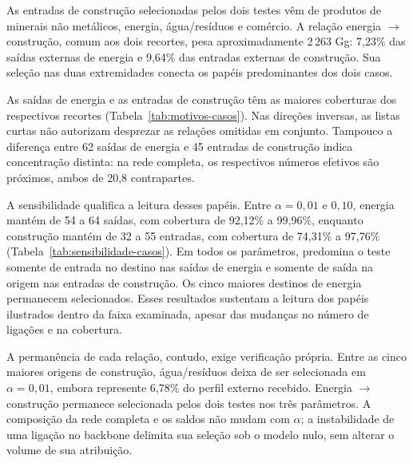 As entradas de construção selecionadas pelos dois testes vêm de produtos de minerais não metálicos, energia, água/resíduos e comércio. A relação energia $\rightarrow$ construção, comum aos dois recortes, pesa aproximadamente 2\,263 Gg: 7,23\% das saídas externas de energia e 9,64\% das entradas externas de construção. Sua seleção nas duas extremidades conecta os papéis predominantes dos dois casos.

As saídas de energia e as entradas de construção têm as maiores coberturas dos respectivos recortes (Tabela~\ref{tab:motivos-casos}). Nas direções inversas, as listas curtas não autorizam desprezar as relações omitidas em conjunto. Tampouco a diferença entre 62 saídas de energia e 45 entradas de construção indica concentração distinta: na rede completa, os respectivos números efetivos são próximos, ambos de 20,8 contrapartes.

A sensibilidade qualifica a leitura desses papéis. Entre $\alpha=0{,}01$ e $0{,}10$, energia mantém de 54 a 64 saídas, com cobertura de 92,12\% a 99,96\%, enquanto construção mantém de 32 a 55 entradas, com cobertura de 74,31\% a 97,76\% (Tabela~\ref{tab:sensibilidade-casos}). Em todos os parâmetros, predomina o teste somente de entrada no destino nas saídas de energia e somente de saída na origem nas entradas de construção. Os cinco maiores destinos de energia permanecem selecionados. Esses resultados sustentam a leitura dos papéis ilustrados dentro da faixa examinada, apesar das mudanças no número de ligações e na cobertura.

A permanência de cada relação, contudo, exige verificação própria. Entre as cinco maiores origens de construção, água/resíduos deixa de ser selecionada em $\alpha=0{,}01$, embora represente 6,78\% do perfil externo recebido. Energia $\rightarrow$ construção permanece selecionada pelos dois testes nos três parâmetros. A composição da rede completa e os saldos não mudam com $\alpha$; a instabilidade de uma ligação no backbone delimita sua seleção sob o modelo nulo, sem alterar o volume de sua atribuição.



